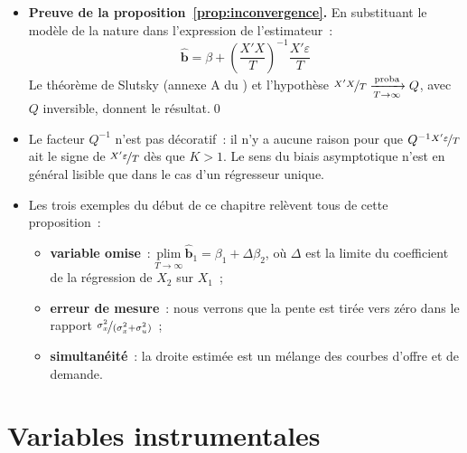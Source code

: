 \documentclass[10pt]{beamer}
\begin{document}
\begin{notes}

  \begin{itemize}

  \item \textbf{Preuve de la proposition~\ref{prop:inconvergence}.} En
    substituant le modèle de la nature dans l'expression de l'estimateur~:
    \[
      \hat{\mathbf b} = \beta + \left( \frac{X'X}{T} \right)^{-1}\frac{X'\varepsilon}{T}
    \]
    Le théorème de Slutsky (annexe A du ) et l'hypothèse $\nicefrac{X'X}{T}\xrightarrow[T\rightarrow\infty]{\text{proba}} Q$, avec $Q$ inversible,
    donnent le résultat.\qed\newline

  \item[\dbend] Le facteur $Q^{-1}$ n'est pas décoratif~: il n'y a aucune raison
    pour que $Q^{-1}\nicefrac{X'\varepsilon}{T}$ ait le signe de
    $\nicefrac{X'\varepsilon}{T}$ dès que $K>1$. Le sens du biais asymptotique
    n'est en général lisible que dans le cas d'un régresseur unique.\newline

  \item Les trois exemples du début de ce chapitre relèvent tous de cette
    proposition~:
    \begin{itemize}
    \item \textbf{variable omise}~: $\underset{T\rightarrow\infty}{\text{plim}}\,\hat{\mathbf b}_1 = \beta_1 + \Delta\beta_2$,
      où $\Delta$ est la limite du coefficient de la régression de $X_2$
      sur $X_1$~;
    \item \textbf{erreur de mesure}~: nous verrons que la pente est tirée vers
      zéro dans le rapport $\nicefrac{\sigma_x^2}{(\sigma_x^2+\sigma_u^2)}$~;
    \item \textbf{simultanéité}~: la droite estimée est un mélange des courbes
      d'offre et de demande.
    \end{itemize}

  \end{itemize}

\end{notes}


\section{Variables instrumentales}
\end{document}
